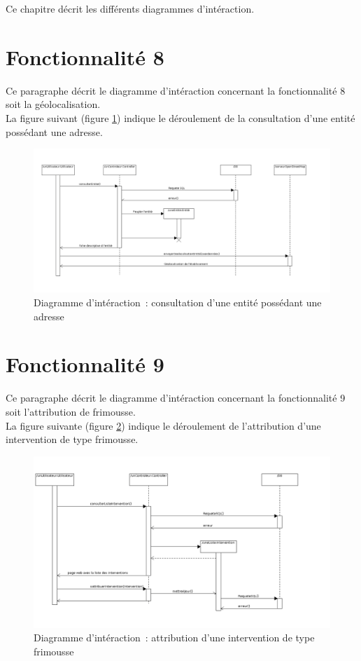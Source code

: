 Ce chapitre décrit les différents diagrammes d'intéraction.

\section{Fonctionnalité 8}
Ce paragraphe décrit le diagramme d'intéraction concernant la fonctionnalité 8 soit la géolocalisation. \\

La figure suivant (figure \ref{diagrammeInteraction1}) indique le déroulement de la consultation d'une entité possédant une adresse.
\begin{figure}[H]
	\centering
	\includegraphics[scale=0.39]{images/diagrammesInteraction/01_diagrammeInteractionF8.png}
	\caption{Diagramme d'intéraction~: consultation d'une entité possédant une adresse}
	\label{diagrammeInteraction1}
\end{figure}

\section{Fonctionnalité 9}
Ce paragraphe décrit le diagramme d'intéraction concernant la fonctionnalité 9 soit l'attribution de frimousse. \\

La figure suivante (figure \ref{diagrammeInteraction3}) indique le déroulement de l'attribution d'une intervention de type frimousse.
\begin{figure}[H]
	\centering
	\includegraphics[scale=0.45]{images/diagrammesInteraction/02_diagrammeInteractionF9.png}
	\caption{Diagramme d'intéraction~: attribution d'une intervention de type frimousse }
	\label{diagrammeInteraction3}
\end{figure}

